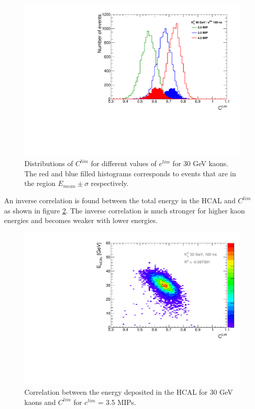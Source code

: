 \begin{figure}[htbp!]
  \centering
  \includegraphics[width=0.7\linewidth]{../Thesis_Plots/ILD/AdditionalPlots/Plots/CLim_100ns_30GeV.pdf}
  \caption{Distributions of $C^{lim}$ for different values of $e^{lim}$ for 30 GeV kaons. The red and blue filled histograms corresponds to events that are in the region $E_{mean} \pm \sigma$ respectively.} \label{fig:CLim30_100ns}
\end{figure}

An inverse correlation is found between the total energy in the HCAL and $C^{lim}$ as shown in figure \ref{fig:EhcalCLim30_100ns}. The inverse correlation is much stronger for higher kaon energies and becomes weaker with lower energies.

\begin{figure}[htbp!]
  \centering
  \includegraphics[width=0.7\linewidth]{../Thesis_Plots/ILD/AdditionalPlots/Plots/EhcalCLim_100ns_30GeV.pdf}
  \caption{Correlation between the energy deposited in the HCAL for 30 GeV kaons and $C^{lim}$ for $e^{lim}$ = 3.5 MIPs.} \label{fig:EhcalCLim30_100ns}
\end{figure}

